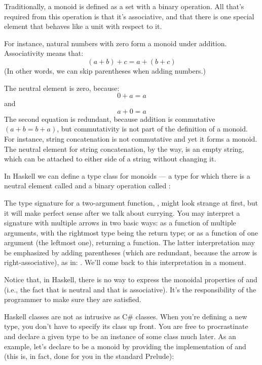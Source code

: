 Traditionally, a monoid is defined as a set with a binary operation. All
that's required from this operation is that it's associative, and that
there is one special element that behaves like a unit with respect to
it.

For instance, natural numbers with zero form a monoid under addition.
Associativity means that:
\[(a + b) + c = a + (b + c)\]
(In other words, we can skip parentheses when adding numbers.)

The neutral element is zero, because:
\[0 + a = a\]
and
\[a + 0 = a\]
The second equation is redundant, because addition is commutative $(a + b
  = b + a)$, but commutativity is not part of the definition of a monoid.
For instance, string concatenation is not commutative and yet it forms a
monoid. The neutral element for string concatenation, by the way, is an
empty string, which can be attached to either side of a string without
changing it.

In Haskell we can define a type class for monoids --- a type for which
there is a neutral element called  and a binary operation
called :

The type signature for a two-argument function,
, might look strange at first,
but it will make perfect sense after we talk about currying. You may
interpret a signature with multiple arrows in two basic ways: as a
function of multiple arguments, with the rightmost type being the return
type; or as a function of one argument (the leftmost one), returning a
function. The latter interpretation may be emphasized by adding
parentheses (which are redundant, because the arrow is
right-associative), as in: .
We'll come back to this interpretation in a moment.

Notice that, in Haskell, there is no way to express the monoidal
properties of  and  (i.e., the fact that
 is neutral and that  is associative).
It's the responsibility of the programmer to make sure they are
satisfied.

Haskell classes are not as intrusive as C\# classes. When you're
defining a new type, you don't have to specify its class up front. You
are free to procrastinate and declare a given type to be an instance of
some class much later. As an example, let's declare  to
be a monoid by providing the implementation of  and
 (this is, in fact, done for you in the standard
Prelude):

